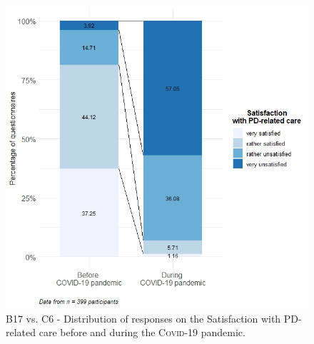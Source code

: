 \documentclass{bmcart}
\begin{document}
\begin{backmatter}
\begin{figure}[!h]
\centering
\includegraphics[width=.90\textwidth]{fig2.satisfaction.care.v1.0.jpeg}
\caption{B17 vs. C6 - Distribution of responses on the Satisfaction with PD-related care before and during the \textsc{Covid}-19 pandemic.}
\label{fig2:satisfaction}
\end{figure}


\end{backmatter}
\end{document}
